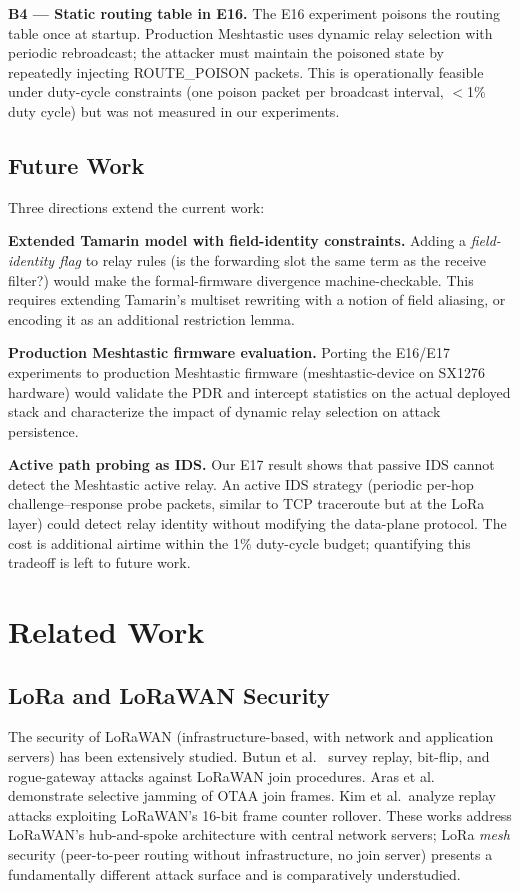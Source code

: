 \documentclass[journal]{IEEEtran}
\begin{document}
\textbf{B4 --- Static routing table in E16.}
The E16 experiment poisons the routing table once at startup. Production
Meshtastic uses dynamic relay selection with periodic rebroadcast; the
attacker must maintain the poisoned state by repeatedly injecting
ROUTE\_POISON packets. This is operationally feasible under duty-cycle
constraints (one poison packet per broadcast interval, $<$1\% duty cycle)
but was not measured in our experiments.

\subsection{Future Work}

Three directions extend the current work:

\textbf{Extended Tamarin model with field-identity constraints.}
Adding a \emph{field-identity flag} to relay rules (is the forwarding slot
the same term as the receive filter?) would make the formal-firmware
divergence machine-checkable. This requires extending Tamarin's multiset
rewriting with a notion of field aliasing, or encoding it as an
additional restriction lemma.

\textbf{Production Meshtastic firmware evaluation.}
Porting the E16/E17 experiments to production Meshtastic firmware
(meshtastic-device on SX1276 hardware) would validate the PDR and
intercept statistics on the actual deployed stack and characterize
the impact of dynamic relay selection on attack persistence.

\textbf{Active path probing as IDS.}
Our E17 result shows that passive IDS cannot detect the Meshtastic
active relay. An active IDS strategy (periodic per-hop challenge--response
probe packets, similar to TCP traceroute but at the LoRa layer) could
detect relay identity without modifying the data-plane protocol.
The cost is additional airtime within the 1\% duty-cycle budget;
quantifying this tradeoff is left to future work.

\section{Related Work}
\label{sec:related}

\subsection{LoRa and LoRaWAN Security}

The security of LoRaWAN (infrastructure-based, with network and application
servers) has been extensively studied. Butun et al.~\cite{butun2019} survey
replay, bit-flip, and rogue-gateway attacks against LoRaWAN join procedures.
Aras et al.~\cite{aras2017} demonstrate selective jamming of OTAA join frames.
Kim et al.\ analyze replay attacks exploiting LoRaWAN's 16-bit frame counter
rollover. These works address LoRaWAN's hub-and-spoke architecture with central
network servers; LoRa \emph{mesh} security (peer-to-peer routing without
infrastructure, no join server) presents a fundamentally different attack
surface and is comparatively understudied.
\end{document}
